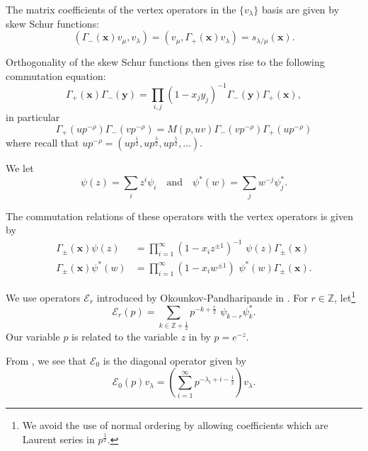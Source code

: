 \documentclass[12pt]{amsart}
\newcommand{\znums} {{\mathbb Z}}		%
\newcommand{\half}{\frac{1}{2}}
\theoremstyle{definition}
\newcommand{\ZplusHalf}{\znums+{ \half}}
\newcommand{\E}{\mathcal{E}}
\newcommand{\ptotheminusrho}{p^{-\rho}}
\begin{document}
The matrix coefficients of the vertex operators in the $\{v_{\lambda}
\}$ basis are given by skew Schur functions:
\begin{equation}\label{eqn: matrix coefs of vertex ops are skew schur}
(\Gamma_{-}(\mathbf{x})v_{\mu},v_{\lambda}) =
(v_{\mu},\Gamma_{+}(\mathbf{x})v_{\lambda}) = s_{\lambda
/\mu}(\mathbf{x}).
\end{equation}

Orthogonality of the skew Schur functions then gives rise to the
following commutation equation:
\[
\Gamma_{+}(\mathbf{x})\Gamma_{-}(\mathbf{y}) = \prod_{i,j}
(1-x_{j}y_{j})^{-1} \Gamma_{-}(\mathbf{y})\Gamma_{+}(\mathbf{x}),
\]
in particular
\begin{equation}\label{eqn: Gamma+Gamma- commutation relation}
\Gamma_{+}(u\ptotheminusrho )\Gamma_{-}(v\ptotheminusrho ) =M(p,uv)
\Gamma_{-}(v\ptotheminusrho )\Gamma_{+}(u\ptotheminusrho )
\end{equation}
where recall that $u\ptotheminusrho  = (up^{\frac{1}{2}},up^{\frac{3}{2}},up^{\frac{5}{2}},\dots )$.

We let
\[
\psi (z) = \sum_{i} z^{i}\psi_{i}\quad \text{and}\quad \psi^{*}(w) =
\sum_{j} w^{-j} \psi_{j}^{*}. 
\]

The commutation relations of these operators with the vertex operators
is given by
\begin{align}\label{eqn: commutation of Gamma(x) with psi(z) and psi*(w)}
\Gamma_{\pm}(\mathbf{x})\psi (z) &= \prod_{i=1}^{\infty}
(1-x_{i}z^{\pm 1})^{-1} \,\, \psi (z)\Gamma_{\pm}(\mathbf{x})\\
\Gamma_{\pm}(\mathbf{x})\psi^{*} (w) &= \prod_{i=1}^{\infty}
(1-x_{i}w^{\pm 1}) \,\,\psi^{*}(w)\Gamma_{\pm}(\mathbf{x}).\nonumber
\end{align}


We use operators $\E_{r}$ introduced by Okounkov-Pandharipande in
\cite[\S~2.2.4]{Okounkov-Pandharipande-completed-cycles}.  For $r\in
\znums$, let\footnote{We avoid the use of normal ordering by allowing
coefficients which are Laurent series in $p^{\half}$.}
\[
\E_{r}(p) = \sum_{k\in \ZplusHalf} p^{-k+\frac{r}{2}}\,\, \psi_{k-r}\psi^{*}_{k}.
\]
Our variable $p$ is related to the variable $z$ in
\cite{Okounkov-Pandharipande-completed-cycles} by $p=e^{-z}.$


From \cite[Eqns~2.9 and 0.18]{Okounkov-Pandharipande-completed-cycles}, we
see that $\E_{0}$ is the diagonal operator given by
\begin{equation}\label{eqn: formula for the operator E0}
\E _0 (p) v_{\lambda} = \left(\sum_{i=1}^{\infty}
p^{-\lambda_{i}+i-\half} \right)v_{\lambda}. 
\end{equation}
\end{document}
